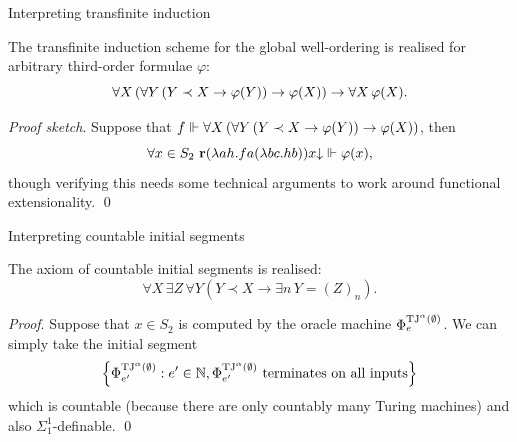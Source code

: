 \documentclass{beamer}
\begin{document}
\begin{frame}{Interpreting transfinite induction}
  \begin{lemma}[$\mathrm{BI}$]
    The transfinite induction scheme for the global well-ordering is realised for arbitrary third-order formulae $\varphi$:
    \[\forall X \left(\forall Y \left(Y \prec X \rightarrow \varphi\mleft(Y\mright)\right) \rightarrow \varphi\mleft(X\mright)\right) \rightarrow \forall X \, \varphi\mleft(X\mright).\]
  \end{lemma}

  \vspace{0.6em}

  \emph{Proof sketch}. Suppose that $f \Vdash \forall X \left(\forall Y \left(Y \prec X \rightarrow \varphi\mleft(Y\mright)\right) \rightarrow \varphi\mleft(X\mright)\right)$, then
  \[\forall x \in S_2 \ \mathbf{r} \mleft(\lambda ah. fa \mleft(\lambda bc. hb\mright)\mright) x {\downarrow} \Vdash \varphi\mleft(x\mright),\]
  though verifying this needs some technical arguments to work around functional extensionality. \qed
\end{frame}

\begin{frame}{Interpreting countable initial segments}
  \begin{lemma}
    The axiom of countable initial segments is realised:
    \[\forall X \, \exists Z \, \forall Y \left(Y \prec X \rightarrow \exists n \, Y = \left(Z\right)_n\right).\]
  \end{lemma}

  \vspace{0.6em}

  \emph{Proof}. Suppose that $x \in S_2$ is computed by the oracle machine $\Phi^{\mathrm{TJ}^\alpha\mleft(\emptyset\mright)}_e$. We can simply take the initial segment
  \[\left\{\Phi^{\mathrm{TJ}^\alpha\mleft(\emptyset\mright)}_{e'} : e' \in \mathbb{N}, \Phi^{\mathrm{TJ}^\alpha\mleft(\emptyset\mright)}_{e'} \text{ terminates on all inputs}\right\}\]
  which is countable (because there are only countably many Turing machines) and also $\Sigma^1_1$-definable. \qed
\end{frame}
\end{document}
